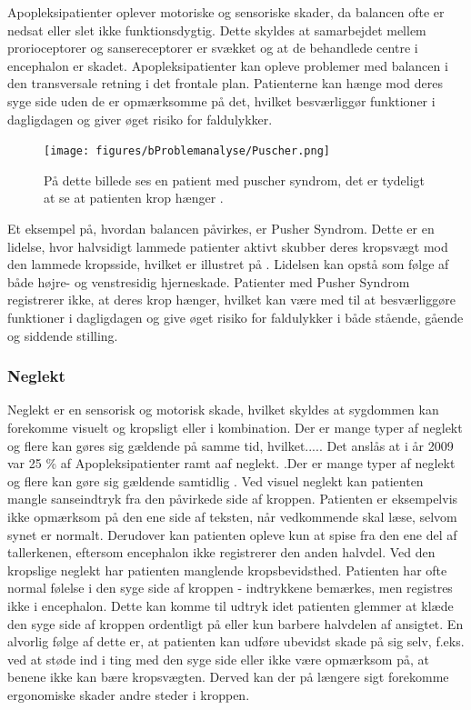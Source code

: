 Apopleksipatienter oplever motoriske og sensoriske skader, da balancen ofte er nedsat eller slet ikke funktionsdygtig.\cite{Karnath2003} Dette skyldes at samarbejdet mellem prorioceptorer og sansereceptorer er svækket og at de behandlede centre i encephalon er skadet. \cite{Martini2012}
Apopleksipatienter kan opleve problemer med balancen i den transversale retning i det frontale plan. Patienterne kan hænge mod deres syge side uden de er opmærksomme på det, hvilket besværliggør funktioner i dagligdagen og giver øget risiko for faldulykker.

\begin{figure}[H]
	\centering
	\texttt{[image: figures/bProblemanalyse/Puscher.png]}
	\caption{På dette billede ses en patient med puscher syndrom, det er tydeligt at se at patienten krop hænger \cite{Karnath2003}.}
	\label{pusher}
\end{figure}


Et eksempel på, hvordan balancen påvirkes, er Pusher Syndrom. Dette er en lidelse, hvor halvsidigt lammede patienter aktivt skubber deres kropsvægt mod den lammede kropsside, hvilket er illustret på . Lidelsen kan opstå som følge af både højre- og venstresidig hjerneskade. Patienter med Pusher Syndrom registrerer ikke, at deres krop hænger, hvilket kan være med til at besværliggøre funktioner i dagligdagen og give øget risiko for faldulykker i både stående, gående og siddende stilling. \cite{Karnath2003} 

\subsubsection{Neglekt}
Neglekt er en sensorisk og motorisk skade, hvilket skyldes at sygdommen kan forekomme visuelt og kropsligt eller i kombination. Der er mange typer af neglekt og flere kan gøres sig gældende på samme tid, hvilket..... Det anslås at i år 2009 var 25 \% af Apopleksipatienter ramt aaf neglekt. \cite{Sundhedsstyrelsen2009}.Der er mange typer af neglekt og flere kan gøre sig gældende samtidlig . 
Ved visuel neglekt kan patienten mangle sanseindtryk fra den påvirkede side af kroppen. Patienten er eksempelvis ikke opmærksom på den ene side af teksten, når vedkommende skal læse, selvom synet er normalt. Derudover kan patienten opleve kun at spise fra den ene del af tallerkenen, eftersom encephalon ikke registrerer den anden halvdel. Ved den kropslige neglekt har patienten manglende kropsbevidsthed. Patienten har ofte normal følelse i den syge side af kroppen - indtrykkene bemærkes, men registres ikke i encephalon. Dette kan komme til udtryk idet patienten glemmer at klæde den syge side af kroppen ordentligt på eller kun barbere halvdelen af ansigtet. En alvorlig følge af dette er, at patienten kan udføre ubevidst skade på sig selv, f.eks. ved at støde ind i ting med den syge side eller ikke være opmærksom på, at benene ikke kan bære kropsvægten. Derved kan der på længere sigt forekomme ergonomiske skader andre steder i kroppen. \cite{Sundhed.dk}

